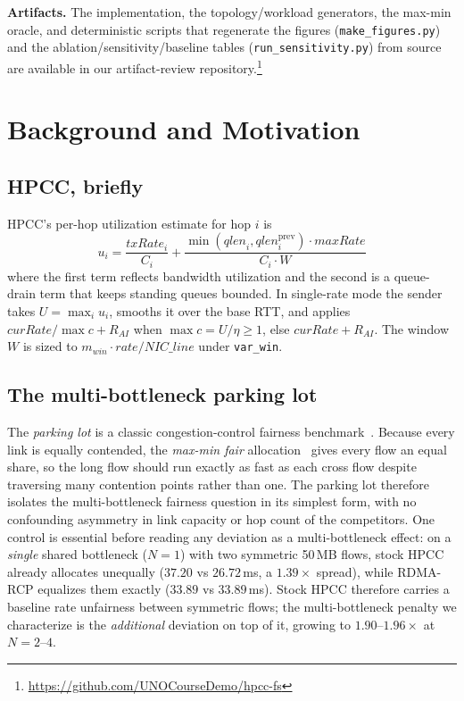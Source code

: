 \documentclass[conference]{IEEEtran}
\newcommand{\hpccfs}{\textsc{RDMA-RCP}\xspace}
\renewcommand{\paragraph}[1]{\par\smallskip\noindent\textbf{#1}\hspace{0.5em}\ignorespaces}
\begin{document}
\paragraph{Artifacts.} The implementation, the topology/workload generators, the max-min oracle,
and deterministic scripts that regenerate the figures (\texttt{make\_figures.py}) and the
ablation/sensitivity/baseline tables (\texttt{run\_sensitivity.py}) from source are available in our
artifact-review repository.\footnote{\url{https://github.com/UNOCourseDemo/hpcc-fs}}

\section{Background and Motivation}
\label{sec:bg}

\subsection{HPCC, briefly}

HPCC's per-hop utilization estimate for hop $i$ is
\begin{equation}
u_i = \frac{\mathit{txRate}_i}{C_i} + \frac{\min(\mathit{qlen}_i, \mathit{qlen}_i^{\mathrm{prev}}) \cdot \mathit{maxRate}}{C_i \cdot W}
\end{equation}
where the first term reflects bandwidth utilization and the second is a queue-drain term that
keeps standing queues bounded. In single-rate mode the sender takes $U = \max_i u_i$, smooths
it over the base RTT, and applies $\mathit{curRate}/\max c + R_{AI}$ when
$\max c = U/\eta \ge 1$, else $\mathit{curRate} + R_{AI}$. The window $W$ is sized to
$m_{win} \cdot \mathit{rate} / \mathit{NIC\_line}$ under \texttt{var\_win}.

\subsection{The multi-bottleneck parking lot}

The \emph{parking lot} is a classic congestion-control fairness
benchmark~\cite{bertsekas1992data, katabi2002xcp}. Because every link is equally contended, the
\emph{max-min fair} allocation~\cite{bertsekas1992data} gives every flow an equal share, so the
long flow should run exactly as fast as each cross flow despite traversing many contention points
rather than one. The parking lot therefore isolates the multi-bottleneck fairness question in its
simplest form, with no confounding asymmetry in link capacity or hop count of the competitors.
One control is essential before reading any deviation as a multi-bottleneck effect: on a
\emph{single} shared bottleneck ($N{=}1$) with two symmetric 50\,MB flows, stock HPCC already
allocates unequally ($37.20$ vs $26.72$\,ms, a $1.39\times$ spread), while \hpccfs equalizes
them exactly ($33.89$ vs $33.89$\,ms). Stock HPCC therefore carries a baseline rate unfairness
between symmetric flows; the multi-bottleneck penalty we characterize is the \emph{additional}
deviation on top of it, growing to $1.90$--$1.96\times$ at $N = 2$--$4$.
\end{document}
